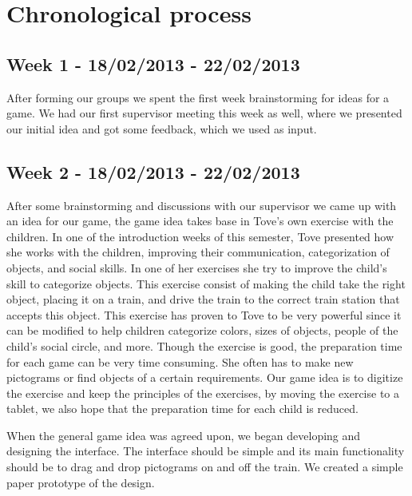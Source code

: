 \chapter{Chronological process}
\label{chronologicalprocess}


\section*{Week 1 - 18/02/2013 - 22/02/2013}

After forming our groups we spent the first week brainstorming for ideas for a game. We had our first supervisor meeting this week as well, where we presented our initial idea and got some feedback, which we used as input. 

\section*{Week 2 - 18/02/2013 - 22/02/2013} 
\label{processweek2}
After some brainstorming and discussions with our supervisor we came up with an idea for our game, the game idea takes base in Tove's own exercise with the children. In one of the introduction weeks of this semester, Tove presented how she works with the children, improving their communication, categorization of objects, and social skills. In one of her exercises she try to improve the child's skill to categorize objects. This exercise consist of making the child take the right object, placing it on a train, and drive the train to the correct train station that accepts this object. This exercise has proven to Tove to be very powerful since it can be modified to help children categorize colors, sizes of objects, people of the child's social circle, and more. Though the exercise is good, the preparation time for each game can be very time consuming. She often has to make new pictograms or find objects of a certain requirements. Our game idea is to digitize the exercise and keep the principles of the exercises, by moving the exercise to a tablet, we also hope that the preparation time for each child is reduced.

When the general game idea was agreed upon, we began developing and designing the interface. The interface should be simple and its main functionality should be to drag and drop pictograms on and off the train. We created a simple paper prototype of the design.

